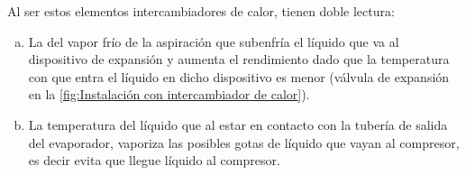Al ser estos elementos intercambiadores de calor, tienen doble lectura:

\begin{enumerate}[a.]
	\item La del vapor frío de la aspiración que subenfría el líquido que va al dispositivo de expansión y aumenta el rendimiento dado que la temperatura con que entra el líquido en dicho dispositivo es menor (válvula de expansión en la \autoref{fig:Instalación con intercambiador de calor}).
	\item La temperatura del líquido que al estar en contacto con la tubería de salida del evaporador, vaporiza las posibles gotas de líquido que vayan al compresor, es decir evita que llegue líquido al compresor.
\end{enumerate}

